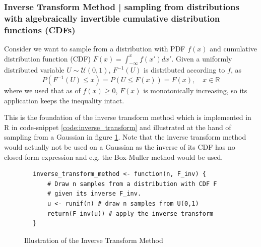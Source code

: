 \subsubsection{Inverse Transform Method | sampling from distributions with algebraically invertible cumulative distribution functions (CDFs)}
Consider we want to sample from a distribution with PDF $f(x)$ and
cumulative distribution function (CDF) $F(x) = \int_{-\infty}^x f(x') dx'$. Given a uniformly distributed variable
$U \sim \mathcal{U}(0,1)$, $F^{-1}(U)$ is distributed according to $f$, as
\begin{equation}
    P(F^{-1}(U) \leq x) = P(U \leq F(x)) = F(x), \quad x \in \mathbb{R}
\end{equation}
where we used that as of $f(x) \geq 0$, $F(x)$ is monotonically increasing, so its application keeps the inequality intact.

This is the foundation of the inverse transform method which is implemented in R in code-snippet \ref{code:inverse_transform} and illustrated
at the hand of sampling from a Gaussian in figure \ref{fig:gaussian_inverse}. Note that the inverse transform method would actually not
be used on a Gaussian as the inverse of its CDF has no closed-form expression and e.g. the Box-Muller method \citep{box58}
would be used.

\begin{codebox}[!htb]
    \begin{verbatim}
        inverse_transform_method <- function(n, F_inv) {
            # Draw n samples from a distribution with CDF F
            # given its inverse F_inv.
            u <- runif(n) # draw n samples from U(0,1)
            return(F_inv(u)) # apply the inverse transform
        }
    \end{verbatim}
    \caption{Inverse Transform Method in R}
    \label{code:inverse_transform}
\end{codebox}

\begin{figure}[!htb]
 \centering
 \hfill
 \caption{Illustration of the Inverse Transform Method}
 \label{fig:gaussian_inverse}
\end{figure}


